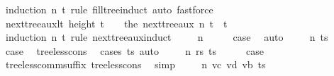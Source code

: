 \begin{isabellebody}
\ {\isacharparenleft}{\kern0pt}induction\ n\ t\ rule{\isacharcolon}{\kern0pt}\ fill{\isacharunderscore}{\kern0pt}tree{\isachardot}{\kern0pt}induct{\isacharcomma}{\kern0pt}\ auto{\isacharcomma}{\kern0pt}\ fastforce{\isacharparenright}{\kern0pt}%
\endisatagproof
{\isafoldproof}%
%
\isadelimproof
\isanewline
%
\endisadelimproof
\isanewline
{}\isamarkupfalse%
\ next{\isacharunderscore}{\kern0pt}tree{\isacharunderscore}{\kern0pt}aux{\isacharunderscore}{\kern0pt}lt{\isacharcolon}{\kern0pt}\ {\isachardoublequoteopen}height\ t\ {\isasymge}\ {}\ {\isasymLongrightarrow}\ the\ {\isacharparenleft}{\kern0pt}next{\isacharunderscore}{\kern0pt}tree{\isacharunderscore}{\kern0pt}aux\ n\ t{\isacharparenright}{\kern0pt}\ {\isacharless}{\kern0pt}\ t{\isachardoublequoteclose}\isanewline
%
\isadelimproof
%
\endisadelimproof
%
\isatagproof
{}\isamarkupfalse%
\ {\isacharparenleft}{\kern0pt}induction\ n\ t\ rule{\isacharcolon}{\kern0pt}\ next{\isacharunderscore}{\kern0pt}tree{\isacharunderscore}{\kern0pt}aux{\isachardot}{\kern0pt}induct{\isacharparenright}{\kern0pt}\isanewline
\ \ \isamarkupfalse%
\ {\isacharparenleft}{\kern0pt}{}\ n{\isacharparenright}{\kern0pt}\isanewline
\ \ \isamarkupfalse%
\ \isamarkupfalse%
\ {\isacharquery}{\kern0pt}case\ \isamarkupfalse%
\ auto\isanewline
{}\isamarkupfalse%
\isanewline
\ \ \isamarkupfalse%
\ {\isacharparenleft}{\kern0pt}{}\ n\ ts{\isacharparenright}{\kern0pt}\isanewline
\ \ \isamarkupfalse%
\ \isamarkupfalse%
\ {\isacharquery}{\kern0pt}case\ \isamarkupfalse%
\ tree{\isacharunderscore}{\kern0pt}less{\isacharunderscore}{\kern0pt}cons{\isacharprime}{\kern0pt}\ \isamarkupfalse%
\ {\isacharparenleft}{\kern0pt}cases\ ts{\isacharparenright}{\kern0pt}\ auto\isanewline
{}\isamarkupfalse%
\isanewline
\ \ \isamarkupfalse%
\ {\isacharparenleft}{\kern0pt}{}\ n\ rs\ ts{\isacharparenright}{\kern0pt}\isanewline
\ \ \isamarkupfalse%
\ \isamarkupfalse%
\ {\isacharquery}{\kern0pt}case\ \isamarkupfalse%
\ tree{\isacharunderscore}{\kern0pt}less{\isacharunderscore}{\kern0pt}comm{\isacharunderscore}{\kern0pt}suffix{}\ tree{\isacharunderscore}{\kern0pt}less{\isacharunderscore}{\kern0pt}cons\ \isamarkupfalse%
\ simp\isanewline
{}\isamarkupfalse%
\isanewline
\ \ \isamarkupfalse%
\ {\isacharparenleft}{\kern0pt}{}\ n\ vc\ vd\ vb\ ts{\isacharparenright}{\kern0pt}\isanewline

\end{isabellebody}
